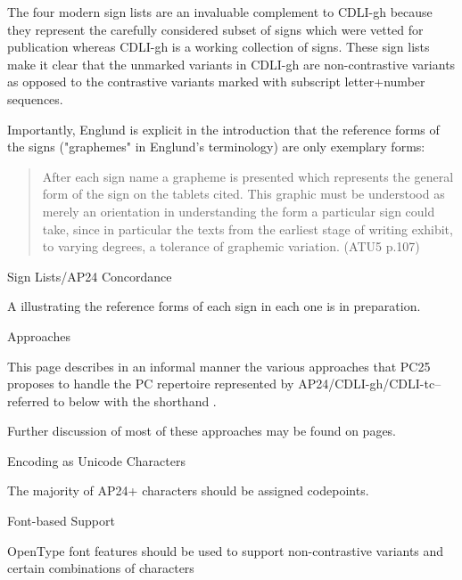 \par The four modern sign lists are an invaluable complement to
      CDLI-gh because they represent the carefully considered subset
      of signs which were vetted for publication whereas CDLI-gh is a
      working collection of signs.  These sign lists make it clear
      that the unmarked variants in CDLI-gh are non-contrastive
      variants as opposed to the contrastive variants marked with
      subscript letter+number sequences.


\par Importantly, Englund is explicit in the introduction that the
      reference forms of the signs ("graphemes" in Englund's
      terminology) are only exemplary forms:

\begin{quote}After each sign name a grapheme is presented which
      represents the general form of the sign on the tablets
      cited. This graphic must be understood as merely an orientation
      in understanding the form a particular sign could take, since in
      particular the texts from the earliest stage of writing exhibit,
      to varying degrees, a tolerance of graphemic variation.  (ATU5
      p.107)
\end{quote}
\Hhhh{}Sign Lists/AP24 Concordance


\par A  illustrating the reference forms
      of each sign in each one is in preparation.

\Hh{}Approaches


\par This page describes in an informal manner the various
      approaches that PC25 proposes to handle the PC repertoire
      represented by AP24/CDLI-gh/CDLI-tc--referred to below with the
      shorthand .


\par Further discussion of most of these approaches may be found
      on  pages.

\Hhhh{}Encoding as Unicode Characters


\par The majority of AP24+ characters should be assigned codepoints.

\Hhhh{}Font-based Support


\par OpenType font features should be used to support
      non-contrastive variants and certain combinations of characters


